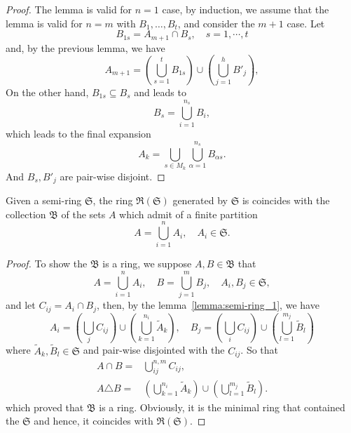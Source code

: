 \begin{proof}
The lemma is valid for $n=1$ case, by induction, we assume that the lemma is valid for $n=m$ with $B_1,\dots,B_t$, and consider the $m+1$ case. Let
\begin{equation}
B_{1s}=A_{m+1}\cap B_s,\quad s=1,\cdots,t
\end{equation} 
and, by the previous lemma, we have
\begin{equation}
A_{m+1}=\left(\bigcup_{s=1}^tB_{1s}\right)\cup\left(\bigcup_{j=1}^hB'_j\right),
\end{equation}
On the other hand, $B_{1s}\subseteq B_s$ and leads to 
\begin{equation}
B_s=\bigcup_{i=1}^{n_s}B_i,
\end{equation}
which leads to the final expansion
\begin{equation}
A_k=\bigcup_{s\in M_k}\bigcup_{\alpha=1}^{n_s}B_{\alpha s}.
\end{equation}
And $B_s,B'_j$ are pair-wise disjoint.
\end{proof}


\begin{lemma}\label{lemma:extension_of_semi-ring}
Given a semi-ring $\mathfrak{S}$, the ring $\mathfrak{R}(\mathfrak{S})$ generated by $\mathfrak{S}$ is coincides with the collection $\mathfrak{B}$ of the sets $A$ which admit of a finite partition
\begin{equation}
A=\bigcup_{i=1}^nA_i,\quad A_i\in\mathfrak{S}.
\end{equation} 
\end{lemma}
\begin{proof}
To show the $\mathfrak{B}$ is a ring, we suppose $A,B\in\mathfrak{B}$ that 
\begin{equation}
A=\bigcup_{i=1}^nA_i,\quad B=\bigcup_{j=1}^mB_j,\quad A_i,B_j\in\mathfrak{S},
\end{equation}
and let $C_{ij}=A_i\cap B_j$, then, by the lemma~\ref{lemma:semi-ring_1}, we have
\begin{equation*}
A_i=\left(\bigcup_{j}C_{ij}\right)\cup\left(\bigcup_{k=1}^{n_i}\tilde A_k\right),\quad B_j=\left(\bigcup_{i}C_{ij}\right)\cup\left(\bigcup_{l=1}^{m_j}\tilde B_l\right)
\end{equation*}
where $\tilde A_k,\tilde B_l\in\mathfrak{S}$ and pair-wise disjointed with the $C_{ij}$. So that
\begin{equation}
\begin{aligned}
A\cap B=&\bigcup_{ij}^{n,m}C_{ij},\\
A\triangle B = &\left(\bigcup_{k=1}^{n_i}\tilde A_k\right)\cup\left(\bigcup_{l=1}^{m_j}\tilde B_l\right).
\end{aligned}
\end{equation}
which proved that $\mathfrak{B}$ is a ring. Obviously, it is the minimal ring that contained the $\mathfrak{S}$ and hence, it coincides with $\mathfrak{R}(\mathfrak{S})$.
\end{proof}

